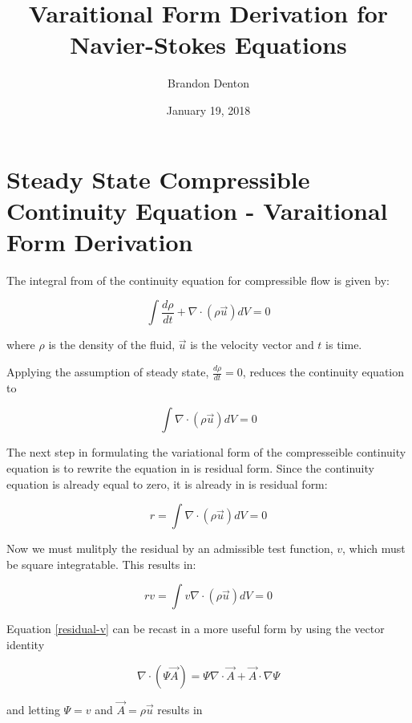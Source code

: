 \documentclass{article}
\begin{document}
\title{Varaitional Form Derivation for Navier-Stokes Equations}
\author{Brandon Denton}
\date{January 19, 2018}

\section{Steady State Compressible Continuity Equation - Varaitional Form Derivation}

The integral from of the continuity equation for compressible flow is given by:

\begin{equation} \label{eq1}
\int \frac{d\rho}{dt}  + \nabla \cdot (\rho \vec{u} ) dV = 0
\end{equation}

where $\rho$ is the density of the fluid, $\vec{u}$ is the velocity vector and $t$ is time.

Applying the assumption of steady state, $\frac{d\rho}{dt} = 0$, reduces the continuity equation to

\begin{equation} \label{eq2}
\int \nabla \cdot (\rho \vec{u} ) dV = 0
\end{equation}

The next step in formulating the variational form of the compresseible continuity equation is to 
rewrite the equation in is residual form. Since the continuity equation is already equal to zero,
it is already in is residual form:

\begin{equation} \label{residual}
r = \int \nabla \cdot (\rho \vec{u} ) dV = 0
\end{equation}

Now we must mulitply the residual by an admissible test function, $v$, which must be square integratable.
This results in:

\begin{equation} \label{residual-v}
rv = \int v \nabla \cdot (\rho \vec{u} ) dV = 0
\end{equation}

Equation \ref{residual-v} can be recast in a more useful form by using the vector identity

\begin{equation} \label{vecIdent}
\nabla \cdot (\Psi \vec{A}) = \Psi \nabla \cdot \vec{A} + \vec{A} \cdot \nabla\Psi
\end{equation}

and letting $\Psi = v$ and $\vec{A} = \rho \vec{u}$ results in
\end{document}

